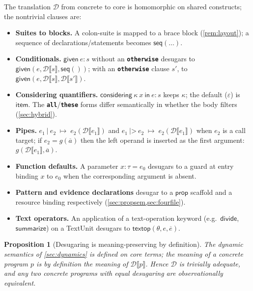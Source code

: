 \documentclass[11pt,a4paper]{article}
\theoremstyle{plain}
\newtheorem{proposition}[theorem]{Proposition}
\theoremstyle{definition}
\theoremstyle{remark}
\newcommand{\tm}[1]{\textbf{\texttt{#1}}}                 %
\newcommand{\sem}[1]{\ensuremath{\llbracket #1 \rrbracket}} %
\begin{document}
The translation $\mathcal{D}$ from concrete to core is homomorphic on shared
constructs; the nontrivial clauses are:

\begin{itemize}[leftmargin=1.4em]
\item \textbf{Suites to blocks.} A colon-suite is mapped to a brace block
(\cref{rem:layout}); a sequence of declarations/statements becomes
$\mathsf{seq}(\dots)$.
\item \textbf{Conditionals.} $\mathsf{given}\ e: s$ without an \tm{otherwise}
desugars to $\mathsf{given}(e, \mathcal{D}\sem{s}, \mathsf{seq}())$; with an
\tm{otherwise} clause $s'$, to $\mathsf{given}(e, \mathcal{D}\sem{s},
\mathcal{D}\sem{s'})$.
\item \textbf{Considering quantifiers.} $\mathsf{considering}\ \kappa\ x\
\mathsf{in}\ e: s$ keeps $\kappa$; the default ($\varepsilon$) is
$\mathsf{item}$. The \tm{all}/\tm{these} forms differ semantically in whether
the body filters (\cref{sec:hybrid}).
\item \textbf{Pipes.} $e_1\ \texttt{|}\ e_2 \;\mapsto\; e_2(\mathcal{D}\sem{e_1})$
and $e_1\ \texttt{|>}\ e_2 \;\mapsto\; e_2(\mathcal{D}\sem{e_1})$ when $e_2$ is a
call target; if $e_2 = g(\overline{a})$ then the left operand is inserted as the
first argument: $g(\mathcal{D}\sem{e_1}, \overline{a})$.
\item \textbf{Function defaults.} A parameter $x:\tau = e_0$ desugars to a
guard at entry binding $x$ to $e_0$ when the corresponding argument is absent.
\item \textbf{Pattern and evidence declarations} desugar to a $\mathsf{prop}$
scaffold and a resource binding respectively (\cref{sec:propsem,sec:fourfile}).
\item \textbf{Text operators.} An application of a text-operation keyword (e.g.\
$\mathsf{divide}$, $\mathsf{summarize}$) on a \textsf{TextUnit} desugars to
$\mathsf{textop}(\theta, e, \overline{e})$.
\end{itemize}

\begin{proposition}[Desugaring is meaning-preserving by definition]
The dynamic semantics of \cref{sec:dynamics} is defined on core terms; the
meaning of a concrete program $p$ is by definition the meaning of
$\mathcal{D}\sem{p}$. Hence $\mathcal{D}$ is trivially adequate, and any two
concrete programs with equal desugaring are observationally equivalent.
\end{proposition}

\end{document}
